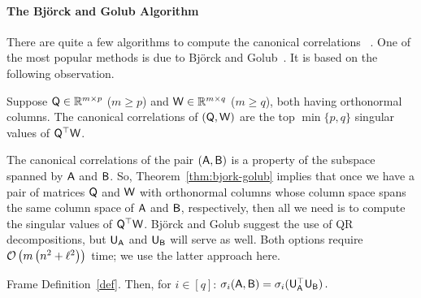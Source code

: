 \paragraph{The Bj{\"o}rck and Golub Algorithm}
%
There are quite a few algorithms to compute the canonical correlations ~\cite{GZ95}. One of the most popular methods is due to Bj{\"o}rck and Golub~\cite{BG73}. It is based on the following observation.
\begin{theorem}\label{thm:bjork-golub}
Suppose ${\mathsf{Q} } \in \mathbb{R}^{m \times p}$ ($m \geq p$) and ${\mathsf{W} } \in \mathbb{R}^{m \times q}$ ($m \geq q$), both having orthonormal columns. The canonical correlations of $({\mathsf{Q} }, {\mathsf{W} })$ are the top $\min\{p,q\}$ singular values of ${\mathsf{Q} }^\top {\ensuremath{\mathsf{W} }}$.
\end{theorem}
The canonical correlations of the pair $({\mathsf{A} },{\mathsf{B} })$ is a property of the subspace spanned by ${\mathsf{A} }$ and ${\mathsf{B} }$. So, Theorem~\ref{thm:bjork-golub} implies that once we have a pair of matrices ${\mathsf{Q} }$ and ${\mathsf{W} }$ with orthonormal columns whose column space spans the same column space of ${\mathsf{A} }$ and ${\mathsf{B} }$, respectively, then all we need is to compute the singular values of ${\mathsf{Q} }^\top {\ensuremath{\mathsf{W} }}$.  Bj{\"o}rck and Golub suggest the use of QR decompositions, but  ${\mathsf{U} }_{\mathsf{A} }$ and ${\mathsf{U} }_{\mathsf{B} }$ will serve as well. Both options require $ \mathcal{O} \left(m\left(n^2 + \ell^2\right) \right)$ time; we use the latter approach here.
%
\begin{corollary}\label{cor:bjork-golub}
Frame Definition~\ref{def}. Then, for $i\in[q]$:
$
\sigma_i({\mathsf{A} }, {\mathsf{B} }) = \sigma_i({\mathsf{U} }^\top_{\mathsf{A} } {\mathsf{U} }_{\mathsf{B} })\,.
$
\end{corollary}
%
%
%

